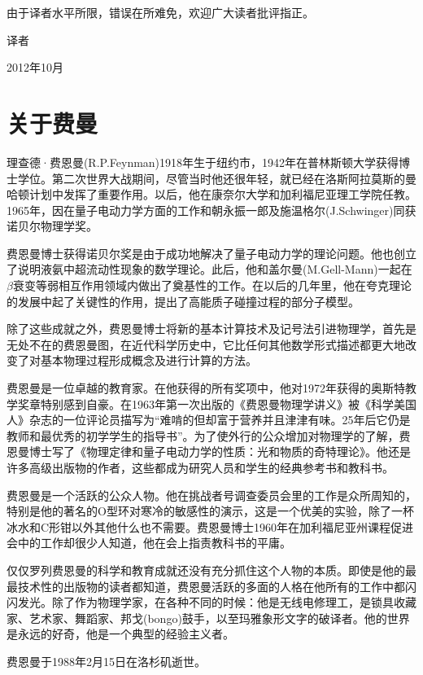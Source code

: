 \documentclass[UTF8, 12pt, a4paper, twoside]{ctexbook}
\begin{document}
由于译者水平所限，错误在所难免，欢迎广大读者批评指正。

\hfill 译者

\hfill 2012年10月

\chapter*{关于费曼}

\setcounter{page}{1}

理查德·费恩曼(R.P.Feynman)1918年生于纽约市，1942年在普林斯顿大学获得博士学位。第二次世界大战期间，尽管当时他还很年轻，就已经在洛斯阿拉莫斯的曼哈顿计划中发挥了重要作用。以后，他在康奈尔大学和加利福尼亚理工学院任教。1965年，因在量子电动力学方面的工作和朝永振一郎及施温格尔(J.Schwinger)同获诺贝尔物理学奖。

费恩曼博士获得诺贝尔奖是由于成功地解决了量子电动力学的理论问题。他也创立了说明液氨中超流动性现象的数学理论。此后，他和盖尔曼(M.Gell-Mann)一起在$\beta$衰变等弱相互作用领域内做出了奠基性的工作。在以后的几年里，他在夸克理论的发展中起了关键性的作用，提出了高能质子碰撞过程的部分子模型。

除了这些成就之外，费恩曼博士将新的基本计算技术及记号法引进物理学，首先是无处不在的费恩曼图，在近代科学历史中，它比任何其他数学形式描述都更大地改变了对基本物理过程形成概念及进行计算的方法。

费恩曼是一位卓越的教育家。在他获得的所有奖项中，他对1972年获得的奥斯特教学奖章特别感到自豪。在1963年第一次出版的《费恩曼物理学讲义》被《科学美国人》杂志的一位评论员描写为“难啃的但却富于营养并且津津有味。25年后它仍是教师和最优秀的初学学生的指导书”。为了使外行的公众增加对物理学的了解，费恩曼博士写了《物理定律和量子电动力学的性质：光和物质的奇特理论》。他还是许多高级出版物的作者，这些都成为研究人员和学生的经典参考书和教科书。

费恩曼是一个活跃的公众人物。他在挑战者号调查委员会里的工作是众所周知的，特别是他的著名的O型环对寒冷的敏感性的演示，这是一个优美的实验，除了一杯冰水和C形钳以外其他什么也不需要。费恩曼博士1960年在加利福尼亚州课程促进会中的工作却很少人知道，他在会上指责教科书的平庸。

仅仅罗列费恩曼的科学和教育成就还没有充分抓住这个人物的本质。即使是他的最最技术性的出版物的读者都知道，费恩曼活跃的多面的人格在他所有的工作中都闪闪发光。除了作为物理学家，在各种不同的时候：他是无线电修理工，是锁具收藏家、艺术家、舞蹈家、邦戈(bongo)鼓手，以至玛雅象形文字的破译者。他的世界是永远的好奇，他是一个典型的经验主义者。

费恩曼于1988年2月15日在洛杉矶逝世。
\end{document}
